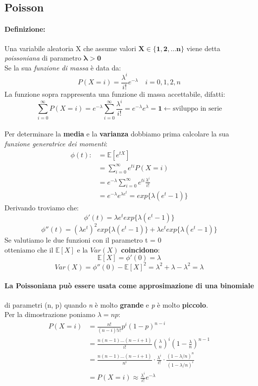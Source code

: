 \documentclass[]{article}
\newcommand{\ev}{\mathbb{E}[X]}
\renewcommand{\ev}[1]{\mathbb{E}[#1]}
\newcommand{\definizione}{\paragraph{Definizione:}}
\begin{document}
    \subsection{Poisson}
    \definizione Una variabile aleatoria X che assume valori $\boldsymbol{X \in \{1,2, \ldots n\}}$ viene detta \textit{poissoniana} di parametro $\boldsymbol{\lambda > 0}$ \\
    Se la sua \textit{funzione di massa} è data da:
    \[ P(X = i) = \frac{\lambda^i}{i!} e^{-\lambda} \quad i = 0,1,2,n \]
    La funzione sopra rappresenta una funzione di massa accettabile, difatti:
    \[ \sum_{i = 0}^{\infty} P(X = i) = e^{-\lambda} \sum_{i = 0}^{\infty} \frac{\lambda^i}{i!} = e^{-\lambda} e^\lambda = \boldsymbol{1} \leftarrow \text{sviluppo in serie} \] \\ 
    Per determinare la \textbf{media} e la \textbf{varianza} dobbiamo prima calcolare la sua \textit{funzione generatrice dei momenti}:
    \begin{equation*}
        \begin{split}
            \phi (t) : & = \ev{e^{tX}} \\ 
            & = \sum_{i = 0}^{\infty} e^{ti} P(X = i) \\
            & = e^{-\lambda} \sum_{i = 0}^{\infty} e^{ti} \frac{\lambda^i}{i!} \\
            & = e^{-\lambda} e^{\lambda e^t} = exp\{\lambda(e^t - 1)\}
        \end{split}
    \end{equation*}
    Derivando troviamo che:
    \[ \phi'(t) = \lambda e^t exp\{\lambda(e^t - 1) \} \]
    \[ \phi''(t) = (\lambda e^t)^2 exp\{\lambda(e^t - 1)\} + \lambda e^t exp\{\lambda(e^t - 1)\} \]
    Se valutiamo le due funzioni con il parametro t = 0 \\
    otteniamo che il $\ev{X}$ e la $Var(X)$ \textbf{coincidono}:
    \[ \ev{X} = \phi'(0) = \lambda \]
    \[ Var(X) = \phi''(0) - \ev{X}^2 = \lambda^2 + \lambda - \lambda^2 = \lambda \]

    \paragraph{La Poissoniana può essere usata come approsimazione di una binomiale} di parametri (n, p) quando \textit{n} è molto \textbf{grande} 
    e \textit{p} è molto \textbf{piccolo}. \\
    Per la dimostrazione poniamo $\lambda = np$:
    \begin{equation*}
        \begin{split}
            P(X = i) &= \frac{n!}{(n-i)! i!} p^i (1-p)^{n-i} \\
            & = \frac{n(n-1) \ldots (n-i+1)}{i!} \binom{\lambda}{n}^i (1 - \frac{\lambda}{n})^{n-1} \\
            & = \frac{n(n-1) \ldots (n-i+1)}{n^i} \cdot \frac{\lambda^i}{i!} \cdot \frac{(1 - \lambda / n)^n}{(1 - \lambda/n)^i} \\
            & = P(X = i) \approx \frac{\lambda^i}{i!} e^{-\lambda}
        \end{split}
    \end{equation*}
\end{document}
